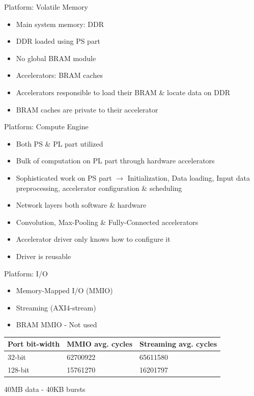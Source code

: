 \begin{frame}{Platform: Volatile Memory}
	\begin{itemize}
		\item Main system memory: DDR
		\item DDR loaded using PS part
		\item No global BRAM module
		\item Accelerators: BRAM caches
		\item Accelerators responsible to load their BRAM \& locate data on DDR
		\item BRAM caches are private to their accelerator
	\end{itemize}
\end{frame}

\begin{frame}{Platform: Compute Engine}
	\begin{itemize}
		\item Both PS \& PL part utilized
		\item Bulk of computation on PL part through hardware accelerators
		\item Sophisticated work on PS part $\rightarrow$ Initialization, Data loading, Input data preprocessing, accelerator configuration \& scheduling
		\item Network layers both software \& hardware
		\item Convolution, Max-Pooling \& Fully-Connected accelerators
		\item Accelerator driver only knows how to configure it
		\item Driver is reusable
	\end{itemize}
\end{frame}

\begin{frame}{Platform: I/O}
	\begin{itemize}
		\item Memory-Mapped I/O (MMIO)
		\item Streaming (AXI4-stream)
		\item BRAM MMIO - Not used
	\end{itemize}
	\centering
	\begin{table}[H]
		\centering
		\begin{tabular}{lll}
			\toprule
			\textbf{Port bit-width} & \textbf{MMIO avg. cycles} & \textbf{Streaming avg. cycles} \\
			\midrule
			32-bit                  & 62700922                  & 65611580                       \\
			128-bit                 & 15761270                  & 16201797                       \\
			\bottomrule
		\end{tabular}
	\end{table}
	40MB data - 40KB bursts
\end{frame}

